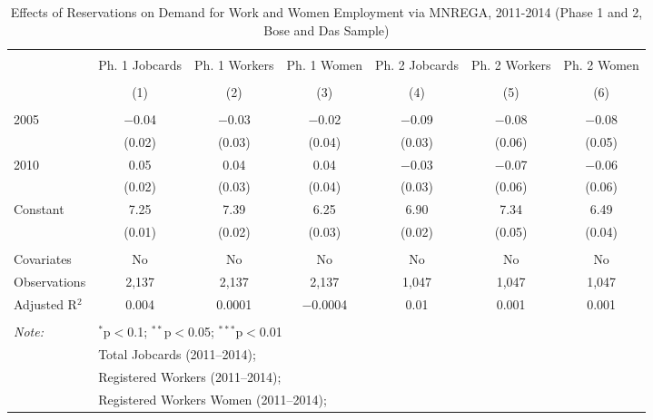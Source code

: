 
\begin{table}[!htbp] \centering 
  \caption{Effects of Reservations on Demand for Work and Women Employment via MNREGA, 2011-2014 (Phase 1 and 2, Bose and Das Sample)} 
  \label{mnrega_main_up_bd} 
\scriptsize 
\begin{tabular}{@{\extracolsep{1pt}}lcccccc} 
\\[-1.8ex]\hline 
\hline \\[-1.8ex] 
 & Ph. 1 Jobcards & Ph. 1 Workers & Ph. 1 Women & Ph. 2 Jobcards & Ph. 2 Workers & Ph. 2 Women \\ 
\\[-1.8ex] & (1) & (2) & (3) & (4) & (5) & (6)\\ 
\hline \\[-1.8ex] 
 2005 & $-$0.04 & $-$0.03 & $-$0.02 & $-$0.09 & $-$0.08 & $-$0.08 \\ 
  & (0.02) & (0.03) & (0.04) & (0.03) & (0.06) & (0.05) \\ 
  2010 & 0.05 & 0.04 & 0.04 & $-$0.03 & $-$0.07 & $-$0.06 \\ 
  & (0.02) & (0.03) & (0.04) & (0.03) & (0.06) & (0.06) \\ 
  Constant & 7.25 & 7.39 & 6.25 & 6.90 & 7.34 & 6.49 \\ 
  & (0.01) & (0.02) & (0.03) & (0.02) & (0.05) & (0.04) \\ 
 \hline \\[-1.8ex] 
Covariates & No & No & No & No & No & No \\ 
Observations & 2,137 & 2,137 & 2,137 & 1,047 & 1,047 & 1,047 \\ 
Adjusted R$^{2}$ & 0.004 & 0.0001 & $-$0.0004 & 0.01 & 0.001 & 0.001 \\ 
\hline 
\hline \\[-1.8ex] 
\textit{Note:}  & \multicolumn{6}{l}{$^{*}$p$<$0.1; $^{**}$p$<$0.05; $^{***}$p$<$0.01} \\ 
 & \multicolumn{6}{l}{Total Jobcards (2011--2014);} \\ 
 & \multicolumn{6}{l}{Registered Workers (2011--2014);} \\ 
 & \multicolumn{6}{l}{Registered Workers Women  (2011--2014);} \\ 
\end{tabular} 
\end{table} 
